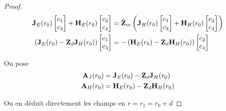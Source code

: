 \begin{proof}
            \begin{align}
                \mathbf{J}_{E}(r_0)
                \begin{bmatrix}
                    c_1 \\
                    c_3
                \end{bmatrix}
                +
                \mathbf{H}_{E}(r_0)
                \begin{bmatrix}
                    c_2 \\
                    c_4
                \end{bmatrix}
                &=
                \hat {\mathbf{Z}}_m
                \left(
                    \mathbf{J}_{H}(r_0)
                    \begin{bmatrix}
                        c_1 \\
                        c_3
                    \end{bmatrix}
                    +
                    \mathbf{H}_{H}(r_0)
                    \begin{bmatrix}
                        c_2 \\
                        c_4
                    \end{bmatrix}
                \right)
                \\
                \left( \mathbf{J}_{E}(r_0) -  \mathbf{Z}_d \mathbf{J}_{H}(r_0) \right)
                \begin{bmatrix}
                    c_1 \\
                    c_3
                \end{bmatrix}
                &=
                -\left( \mathbf{H}_{E}(r_0) -  \mathbf{Z}_d \mathbf{H}_{H}(r_0) \right)
                \begin{bmatrix}
                    c_2 \\
                    c_4
                \end{bmatrix}
            \end{align}

            On pose 
            \begin{align}
                \mathbf{A}_J(r_0) &= \mathbf{J}_{E}(r_0) -  \mathbf{Z}_d \mathbf{J}_{H}(r_0)
                \\
                \mathbf{A}_H(r_0) &= \mathbf{H}_{E}(r_0) -  \mathbf{Z}_d \mathbf{H}_{H}(r_0)
            \end{align}


            On en déduit directement les champs en $r=r_1=r_0+d$


\end{proof}
